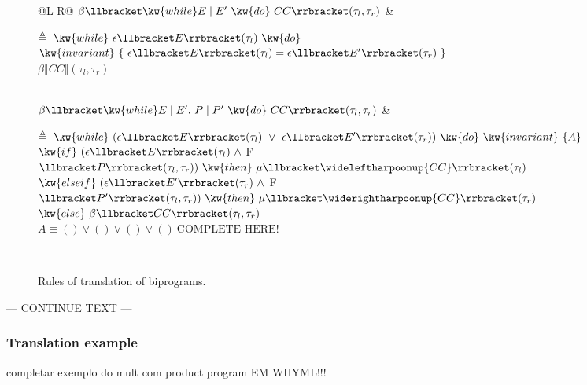 \begin{figure}[ht]
\begin{minipage}{0.99\linewidth}
\begin{tabularx}{\linewidth}{@{}L R@{}}
      $\beta\llbracket \kw{while } E\mid E' \ \kw{do}\ CC\rrbracket(\tau_l,\tau_r)$ &
      \parbox[t]{\hsize}{%
        $\triangleq\ \kw{while}\ \epsilon\llbracket E\rrbracket(\tau_l)\ \kw{do}$\\[2pt]
        \hspace{2.2em}$\kw{invariant}\ \{\ \epsilon\llbracket E\rrbracket(\tau_l)=\epsilon\llbracket E'\rrbracket(\tau_r)\ \}$\\[2pt]
        \hspace{2.2em}$\beta\llbracket CC\rrbracket(\tau_l,\tau_r)$
      } \\[8pt]

      $\beta\llbracket \kw{while } E\mid E' .\ P\mid P' \ \kw{do}\ CC\rrbracket(\tau_l,\tau_r)$ &
      \parbox[t]{\hsize}{%
        $\triangleq\ \kw{while}\ (\epsilon\llbracket E\rrbracket(\tau_l)\ \lor\ \epsilon\llbracket E'\rrbracket(\tau_r))\ \kw{do}\ \kw{invariant}\ \{A\}$\\[2pt]
        \hspace{2.2em}$\kw{if}\ (\epsilon\llbracket E\rrbracket(\tau_l)\ \land\ $F$\llbracket P\rrbracket(\tau_l,\tau_r))\ \kw{then}\ \mu\llbracket \wideleftharpoonup{CC}\rrbracket(\tau_l)$\\[2pt]
        \hspace{2.2em}$\kw{else if}\ (\epsilon\llbracket E'\rrbracket(\tau_r)\ \land\ $F$\llbracket P'\rrbracket(\tau_l,\tau_r))\ \kw{then}\ \mu\llbracket \widerightharpoonup{CC}\rrbracket(\tau_r)$\\[2pt]
        \hspace{2.2em}$\kw{else}\ \beta\llbracket CC\rrbracket(\tau_l,\tau_r)$\\[4pt]
        \hspace{0.0em} $A \equiv () \lor () \lor () \lor ()\ \text{COMPLETE HERE!}$
      } \\

    \end{tabularx}
  \end{minipage}
  \caption{Rules of translation of biprograms.}
  \label{fig:translation-biprograms-rules}
\end{figure}

--- CONTINUE TEXT ---



\subsubsection{Translation example}
\label{subsubsec:whyrel_translation_example}
completar exemplo do mult com product program EM WHYML!!!

